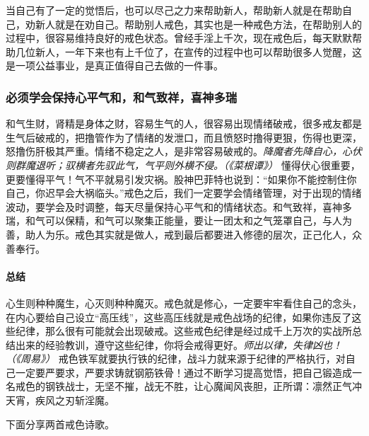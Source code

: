 当自己有了一定的觉悟后，也可以尽己之力来帮助新人，帮助新人就是在帮助自己，劝新人就是在劝自己。帮助别人戒色，其实也是一种戒色方法，在帮助别人的过程中，很容易维持良好的戒色状态。曾经手淫上千次，现在戒色后，每天默默帮助几位新人，一年下来也有上千位了，在宣传的过程中也可以帮助很多人觉醒，这是一项公益事业，是真正值得自己去做的一件事。

\subsubsection{必须学会保持心平气和，和气致祥，喜神多瑞}

和气生财，肾精是身体之财，容易生气的人，很容易出现情绪破戒，很多戒友都是生气后破戒的，把撸管作为了情绪的发泄口，而且愤怒时撸得更狠，伤得也更深，怒撸伤肝极其严重。情绪不稳定之人，是非常容易破戒的。\textit{降魔者先降自心，心伏则群魔退听；驭横者先驭此气，气平则外横不侵。（《菜根谭》）} 懂得伏心很重要，更要懂得平气！气不平就易引发灾祸。股神巴菲特也说到：“如果你不能控制住你自己，你迟早会大祸临头。”戒色之后，我们一定要学会情绪管理，对于出现的情绪波动，要学会及时调整，每天尽量保持心平气和的情绪状态。和气致祥，喜神多瑞，和气可以保精，和气可以聚集正能量，要让一团太和之气笼罩自己，与人为善，助人为乐。戒色其实就是做人，戒到最后都要进入修德的层次，正己化人，众善奉行。

\paragraph*{总结}

心生则种种魔生，心灭则种种魔灭。戒色就是修心，一定要牢牢看住自己的念头，在内心要给自己设立“高压线”，这些高压线就是戒色战场的纪律，如果你违反了这些纪律，那么很有可能就会出现破戒。这些戒色纪律是经过成千上万次的实战所总结出来的经验教训，遵守这些纪律，你将会戒得更好。\textit{师出以律，失律凶也！（《周易》）} 戒色铁军就要执行铁的纪律，战斗力就来源于纪律的严格执行，对自己一定要严要求，严要求铸就钢筋铁骨！通过不断学习提高觉悟，把自己锻造成一名戒色的钢铁战士，无坚不摧，战无不胜，让心魔闻风丧胆，正所谓：凛然正气冲天宵，疾风之刃斩淫魔。

下面分享两首戒色诗歌。

